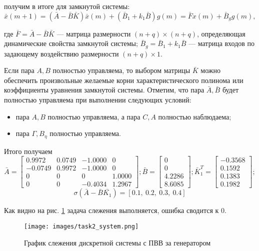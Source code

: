 \documentclass[a4paper, 14pt]{extarticle}
\theoremstyle{definition}
\theoremstyle{plain}
\theoremstyle{remark}
\begin{document}
получим в итоге для замкнутой системы:
\[
\bar{x}(m + 1) = (\bar{A} - \bar{B} \bar{K}) \bar{x}(m) + (\bar{B}_1 + k_1 \bar{B}) g(m) = \bar{F} x(m) + \bar{B}_g g(m),
\]

где \(\bar{F} = \bar{A} - \bar{B} \bar{K}\) — матрица размерности \((n + q) \times (n + q)\), определяющая динамические свойства замкнутой системы; \(\bar{B}_g = \bar{B}_1 + k_1 \bar{B}\) — матрица входов по задающему воздействию размерности \((n + q) \times 1\).

Если пара \(A, B\) полностью управляема, то выбором матрицы \(\bar{K}\) можно обеспечить произвольные желаемые корни характеристического полинома или коэффициенты уравнения замкнутой системы. Отметим, что пара \(\bar{A}, \bar{B}\) будет полностью управляема при выполнении следующих условий:

\begin{itemize}
    \item пара \(A, B\) полностью управляема, а пара \(C, A\) полностью наблюдаема;
    \item пара \(\Gamma, B_\eta\) полностью управляема.
\end{itemize}

Итого получаем
\[
\bar A =
	\begin{bmatrix}
	0.9972 & 0.0749 & -1.0000 & 0 \\
	-0.0749 & 0.9972 & -1.0000 & 0 \\
	0 & 0 & 0 & 1.0000 \\
	0 & 0 & -0.4034 & 1.2967
	\end{bmatrix};
\bar B = \begin{bmatrix}
	0 \\
	0 \\
	4.2286 \\
	8.6085
	\end{bmatrix};
\bar K_1^T = \begin{bmatrix}
	-0.3568 \\ 0.1592 \\ 0.1383 \\ 0.1982
	\end{bmatrix};
\]
\[\sigma(\bar{A} - \bar{B} \bar{K_1}) = [0.1,~0.2,~0.3,~0.4]\]

Как видно на рис. \ref{fig:task2_y} задача слежения выполняется, ошибка сводится к 0.
\begin{figure}
	[H]
	\centering
	\texttt{[image: images/task2\_system.png]}
	\caption{График слежения дискретной системы с ПВВ за генератором}
	\label{fig:task2_y}
\end{figure}
\end{document}
